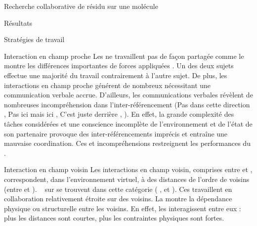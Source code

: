 \documentclass[myfrancais]{mythesis}
\begin{document}
\begin{mychapter}{Recherche collaborative de résidu sur une molécule}
\begin{mysection}{Résultats}
\begin{mysubsection}{Stratégies de travail}
\begin{mysubsubsection}{Interaction en champ proche}
					Les  ne travaillent pas de façon partagée comme le montre les différences importantes de forces appliquées .
					Un des deux sujets effectue une majorité du travail contrairement à l'autre sujet.
					De plus, les interactions en champ proche générent de nombreux  nécessitant une communication verbale accrue.
					D'ailleurs, les communications verbales révèlent de nombreuses incompréhension dans l'inter-référencement (\og Pas dans cette direction \fg, \og Pas ici mais ici \fg, \og C'est juste derrière \fg, \myetc).
					En effet, la grande complexité des tâches considérées et une conscience incomplète de l'environnement et de l'état de son partenaire provoque des inter-référencements imprécis et entraîne une mauvaise coordination.
					Ces  et incompréhensions restreignent les performances du .
				\end{mysubsubsection}
				\begin{mysubsubsection}{Interaction en champ voisin}
					Les interactions en champ voisin, comprises entre  et , correspondent, dans l'environnement virtuel, à des distances de l'ordre de  voisins (entre  et ).
					~ sur  se trouvent dans cette catégorie ( ,  et ).
					Ces  travaillent en collaboration relativement étroite sur des  voisins.
					La  montre la dépendance physique ou structurelle entre les  voisins.
					En effet, les  interagissent entre eux : plus les distances sont courtes, plus les contraintes physiques sont fortes.


\end{mysubsubsection}
\end{mysubsection}
\end{mysection}
\end{mychapter}
\end{document}

